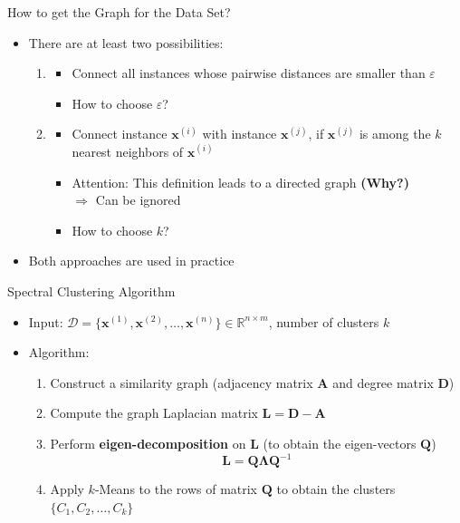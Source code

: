 \begin{frame}{How to get the Graph for the Data Set?}{}\important
	\begin{itemize}
		\item There are at least two possibilities:
		\begin{enumerate}
			\item {}
			\begin{itemize}
				\item Connect all instances whose pairwise distances are smaller than $\varepsilon$
				\item {} How to choose $\varepsilon$?
			\end{itemize}
			\item {}
			\begin{itemize}
				\item Connect instance $\bm{x}^{(i)}$ with instance $\bm{x}^{(j)}$, if $\bm{x}^{(j)}$ is among the $k$ nearest neighbors of $\bm{x}^{(i)}$
				\item Attention: This definition leads to a directed graph \textbf{(Why?)} \\
					$\Rightarrow$ Can be ignored
				\item {} How to choose $k$?
			\end{itemize}
		\end{enumerate}
		\item Both approaches are used in practice
	\end{itemize}
\end{frame}


\begin{frame}{Spectral Clustering Algorithm}{}\important
	\begin{itemize}
		\item Input: $\mathcal{D} = \{ \bm{x}^{(1)}, \bm{x}^{(2)}, \dots, \bm{x}^{(n)} \} \in \mathbb{R}^{n \times m}$,
			number of clusters $k$
		\item Algorithm:
		\begin{enumerate}
			\item Construct a similarity graph (adjacency matrix $\bm{A}$ and degree matrix $\bm{D}$)
			\item Compute the graph Laplacian matrix $\bm{L} = \bm{D} - \bm{A}$
			\item Perform \textbf{eigen-decomposition} on $\bm{L}$ (to obtain the eigen-vectors $\bm{Q}$)
			\begin{equation*}
				\bm{L} = \bm{Q}\bm{\Lambda}\bm{Q}^{-1}
			\end{equation*}
			\item Apply $k$-Means to the rows of matrix $\bm{Q}$ to obtain the clusters $\{ C_1, C_2, \dots, C_k \}$
		\end{enumerate} 
	\end{itemize}
\end{frame}



